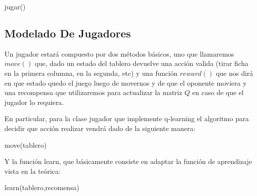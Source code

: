 \begin{algorithm}[h!]
\begin{algorithmic}[1]\parskip=1mm
 \caption{jugar()}
\end{algorithmic}
\end{algorithm}


\subsection{Modelado De Jugadores}

Un jugador estará compuesto por dos métodos básicos, uno que llamaremos $move()$ que, dado un estado del tablero devuelve una acción valida (tirar ficha en la primera columna, en la segunda, etc) y una función $reward()$ que nos dirá en que estado quedo el juego luego de movernos y de que el oponente moviera y una recompensa que utilizaremos para actualizar la matriz $Q$ en caso de que el jugador lo requiera.

En particular, para la clase jugador que implemente q-learning el algoritmo para decidir que acción realizar vendrá dado de la siguiente manera:

\begin{algorithm}[h!]
\begin{algorithmic}[1]\parskip=1mm
 \caption{move(tablero)}
\end{algorithmic}
\end{algorithm}

Y la función learn, que básicamente consiste en adaptar la función de aprendizaje vista en la teórica:

\begin{algorithm}[h!]
\begin{algorithmic}[1]\parskip=1mm
 \caption{learn(tablero,recomensa)}
\end{algorithmic}
\end{algorithm}

